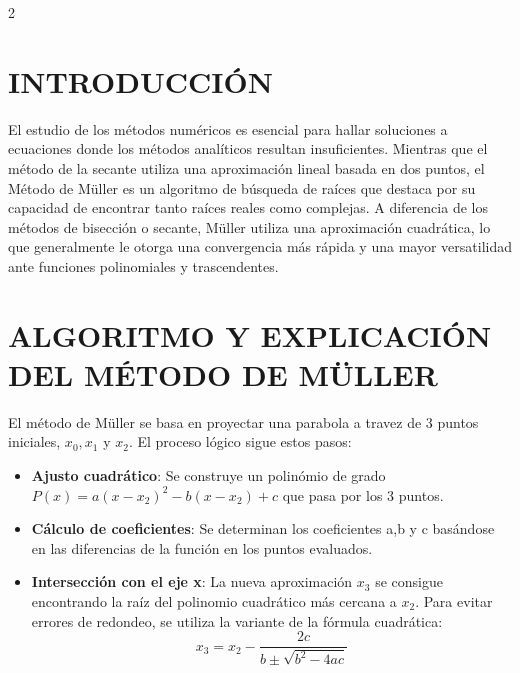 \documentclass{rmf-d}
\begin{document}
\begin{multicols}{2}

\section{INTRODUCCIÓN}
\label{sec:1}
El estudio de los métodos numéricos es esencial para hallar soluciones a ecuaciones donde los métodos analíticos resultan insuficientes. Mientras que el método de la secante utiliza una aproximación lineal basada en dos puntos, el Método de Müller es un algoritmo de búsqueda de raíces que destaca por su capacidad de encontrar tanto raíces reales como complejas. A diferencia de los métodos de bisección o secante, Müller utiliza una aproximación cuadrática, lo que generalmente le otorga una convergencia más rápida y una mayor versatilidad ante funciones polinomiales y trascendentes.
































\section{ALGORITMO Y EXPLICACIÓN DEL
MÉTODO DE MÜLLER}
\label{sec:2}
El método de Müller se basa en proyectar una parabola a travez de 3 puntos iniciales, $x_0, x_1$ y $x_2$. El proceso lógico sigue estos pasos:
\begin{itemize}
    \item \textbf{Ajusto cuadrático}: Se construye un polinómio de grado $P(x)=a(x-x_2)^2-b(x-x_2)+c$ que pasa por los 3 puntos.
    \item \textbf{Cálculo de coeficientes}: Se determinan los coeficientes a,b y c basándose en las diferencias de la función en los puntos evaluados.
    \item \textbf{Intersección con el eje x}: La nueva aproximación $x_3$ se consigue encontrando la raíz del polinomio cuadrático más cercana a $x_2$. Para evitar errores de redondeo, se utiliza la variante de la fórmula cuadrática:
    \begin{equation}
        x_3 = x_2 - \frac{2c}{b\pm{\sqrt{b^2-4ac}}}
    \end{equation}


\end{itemize}
\end{multicols}
\end{document}
